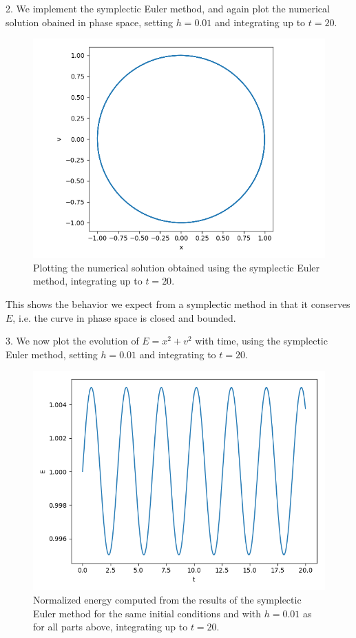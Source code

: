 \documentclass[11pt]{article}
\begin{document}
2. We implement the symplectic Euler method, and again plot the numerical solution obained in phase space, setting $h=0.01$ and integrating up to $t=20$. \\
\newpage

\begin{figure}[htp]
\centering
\includegraphics[scale=0.80]{symplectic_euler_phase_space_1_0_0-01_20.png}
\caption{Plotting the numerical solution obtained using the symplectic Euler method, integrating up to $t=20$.}
\label{sympphase}
\end{figure}

This shows the behavior we expect from a symplectic method in that it conserves $E$, i.e. the curve in phase space is closed and bounded.
\newpage

3. We now plot the evolution of $E=x^2+v^2$ with time, using the symplectic Euler method, setting $h=0.01$ and integrating to $t=20$. \\

\begin{figure}[htp]
\centering
\includegraphics[scale=0.80]{symplectic_energy_1_0_0-01_20.png}
\caption{Normalized energy computed from the results of the symplectic Euler method for the same initial conditions and with $h=0.01$ as for all parts above, integrating up to $t=20$.}
\label{sympenergy}
\end{figure}
\end{document}
